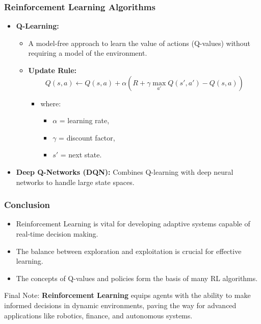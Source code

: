 \documentclass[aspectratio=169]{beamer}
\begin{document}
\begin{frame}[fragile]
    \frametitle{Reinforcement Learning Algorithms}
    \begin{itemize}
        \item \textbf{Q-Learning:} 
        \begin{itemize}
            \item A model-free approach to learn the value of actions (Q-values) without requiring a model of the environment.
            \item \textbf{Update Rule:} 
            \begin{equation}
                Q(s, a) \leftarrow Q(s, a) + \alpha \left( R + \gamma \max_{a'} Q(s', a') - Q(s, a) \right)
            \end{equation}
            \begin{itemize}
                \item where:
                \begin{itemize}
                    \item $\alpha$ = learning rate,
                    \item $\gamma$ = discount factor,
                    \item $s'$ = next state.
                \end{itemize}
            \end{itemize}
        \end{itemize}
        
        \item \textbf{Deep Q-Networks (DQN):} Combines Q-learning with deep neural networks to handle large state spaces.
    \end{itemize}
\end{frame}

\begin{frame}[fragile]
    \frametitle{Conclusion}
    \begin{itemize}
        \item Reinforcement Learning is vital for developing adaptive systems capable of real-time decision making.
        \item The balance between exploration and exploitation is crucial for effective learning.
        \item The concepts of Q-values and policies form the basis of many RL algorithms.
    \end{itemize}
    \begin{block}{Final Note:}
        \textbf{Reinforcement Learning} equips agents with the ability to make informed decisions in dynamic environments, paving the way for advanced applications like robotics, finance, and autonomous systems.
    \end{block}
\end{frame}
\end{document}
